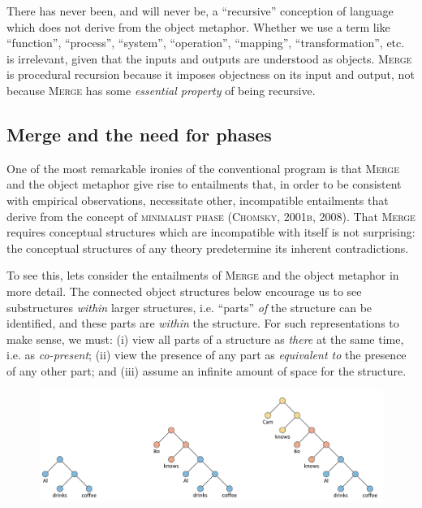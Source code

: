   There has never been, and will never be, a “recursive” conception of language which does not derive from the object metaphor. Whether we use a term like “function”, “process”, “system”, “operation”, “mapping”, “transformation”, etc. is irrelevant, given that the inputs and outputs are understood as objects. \textsc{Merge} is procedural recursion because it imposes objectness on its input and output, not because \textsc{Merge} has some \textit{essential property} of being recursive.

\subsection{Merge and the need for phases}

One of the most remarkable ironies of the conventional program is that \textsc{Merge} and the object metaphor give rise to entailments that, in order to be consistent with empirical observations, necessitate other, incompatible entailments that derive from the concept of \textsc{minimalist phase} (\textsc{Chomsky, 2001b, 2008)}. That \textsc{Merge} requires conceptual structures which are incompatible with itself is not surprising: the conceptual structures of any theory predetermine its inherent contradictions.

  To see this, lets consider the entailments of \textsc{Merge} and the object metaphor in more detail. The connected object structures below encourage us to see substructures \textit{within} larger structures, i.e. “parts” \textit{of} the structure can be identified, and these parts are \textit{within} the structure. For such representations to make sense, we must: (i) view all parts of a structure as \textit{there} at the same time, i.e. as \textit{co-present}; (ii) view the presence of any part as \textit{equivalent to} the presence of any other part; and (iii) assume an infinite amount of space for the structure.

  
\begin{figure}
\includegraphics[width=\textwidth]{figures/Tilsen-img110.png}
\caption{\missingcaption}
\label{fig:}
\end{figure}
 

